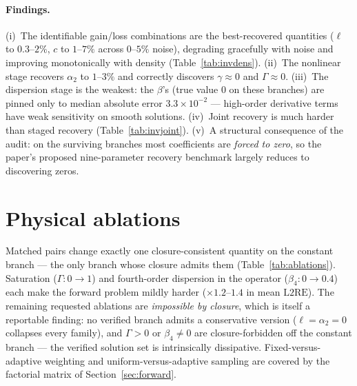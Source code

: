 \documentclass[11pt,a4paper]{article}
\newcommand{\lre}{\mathrm{L2RE}}
\begin{document}
\begin{table}[htbp]\centering
\caption{Observation-density sweep for the gain/loss stage (noise levels
pooled; median over seeds and branches).}
\label{tab:invdens}
\small

\end{table}

\begin{table}[htbp]\centering
\caption{Staged versus joint recovery. Joint four-parameter recovery degrades
by roughly an order of magnitude for the genuinely nonzero parameters,
consistent with the $\sim10^{11}$ conditioning of the sensitivity matrix.}
\label{tab:invjoint}
\small

\end{table}

\paragraph{Findings.}
(i)~The identifiable gain/loss combinations are the best-recovered quantities
($\ell$ to $0.3$--$2\%$, $c$ to $1$--$7\%$ across $0$--$5\%$ noise), degrading
gracefully with noise and improving monotonically with density
(Table~\ref{tab:invdens}).
(ii)~The nonlinear stage recovers $\alpha_2$ to $1$--$3\%$ and correctly
discovers $\gamma\approx0$ and $\Gamma\approx0$.
(iii)~The dispersion stage is the weakest: the $\beta$'s (true value $0$ on
these branches) are pinned only to median absolute error
$3.3\times10^{-2}$ --- high-order derivative terms have weak sensitivity on
smooth solutions.
(iv)~Joint recovery is much harder than staged recovery
(Table~\ref{tab:invjoint}).
(v)~A structural consequence of the audit: on the surviving branches most
coefficients are \emph{forced to zero}, so the paper's proposed
nine-parameter recovery benchmark largely reduces to discovering zeros.

\section{Physical ablations}
\label{sec:ablations}

Matched pairs change exactly one closure-consistent quantity on the constant
branch --- the only branch whose closure admits them
(Table~\ref{tab:ablations}). Saturation ($\Gamma:0\to1$) and fourth-order
dispersion in the operator ($\beta_4:0\to0.4$) each make the forward problem
mildly harder ($\times1.2$--$1.4$ in mean $\lre$). The remaining requested
ablations are \emph{impossible by closure}, which is itself a reportable
finding: no verified branch admits a conservative version
($\ell=\alpha_2=0$ collapses every family), and $\Gamma>0$ or $\beta_4\neq0$
are closure-forbidden off the constant branch --- the verified solution set is
intrinsically dissipative. Fixed-versus-adaptive weighting and
uniform-versus-adaptive sampling are covered by the factorial matrix of
Section~\ref{sec:forward}.
\end{document}
